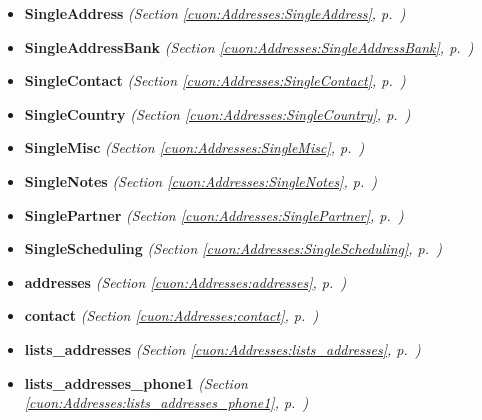 \begin{itemize}
\setlength{\parskip}{0ex}
\item \textbf{SingleAddress}
  \textit{(Section \ref{cuon:Addresses:SingleAddress}, p.~\pageref{cuon:Addresses:SingleAddress})}

\item \textbf{SingleAddressBank}
  \textit{(Section \ref{cuon:Addresses:SingleAddressBank}, p.~\pageref{cuon:Addresses:SingleAddressBank})}

\item \textbf{SingleContact}
  \textit{(Section \ref{cuon:Addresses:SingleContact}, p.~\pageref{cuon:Addresses:SingleContact})}

\item \textbf{SingleCountry}
  \textit{(Section \ref{cuon:Addresses:SingleCountry}, p.~\pageref{cuon:Addresses:SingleCountry})}

\item \textbf{SingleMisc}
  \textit{(Section \ref{cuon:Addresses:SingleMisc}, p.~\pageref{cuon:Addresses:SingleMisc})}

\item \textbf{SingleNotes}
  \textit{(Section \ref{cuon:Addresses:SingleNotes}, p.~\pageref{cuon:Addresses:SingleNotes})}

\item \textbf{SinglePartner}
  \textit{(Section \ref{cuon:Addresses:SinglePartner}, p.~\pageref{cuon:Addresses:SinglePartner})}

\item \textbf{SingleScheduling}
  \textit{(Section \ref{cuon:Addresses:SingleScheduling}, p.~\pageref{cuon:Addresses:SingleScheduling})}

\item \textbf{addresses}
  \textit{(Section \ref{cuon:Addresses:addresses}, p.~\pageref{cuon:Addresses:addresses})}

\item \textbf{contact}
  \textit{(Section \ref{cuon:Addresses:contact}, p.~\pageref{cuon:Addresses:contact})}

\item \textbf{lists\_addresses}
  \textit{(Section \ref{cuon:Addresses:lists_addresses}, p.~\pageref{cuon:Addresses:lists_addresses})}

\item \textbf{lists\_addresses\_phone1}
  \textit{(Section \ref{cuon:Addresses:lists_addresses_phone1}, p.~\pageref{cuon:Addresses:lists_addresses_phone1})}


\end{itemize}

